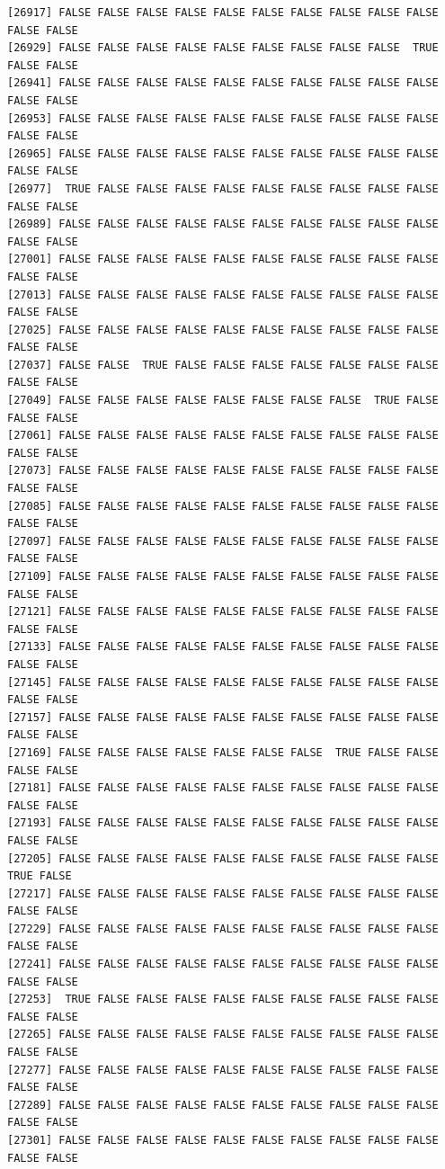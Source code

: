 \documentclass[
  a4paper,
  DIV=11,
  numbers=noendperiod]{scrartcl}
\begin{document}
\begin{verbatim}
[26917] FALSE FALSE FALSE FALSE FALSE FALSE FALSE FALSE FALSE FALSE FALSE FALSE
[26929] FALSE FALSE FALSE FALSE FALSE FALSE FALSE FALSE FALSE  TRUE FALSE FALSE
[26941] FALSE FALSE FALSE FALSE FALSE FALSE FALSE FALSE FALSE FALSE FALSE FALSE
[26953] FALSE FALSE FALSE FALSE FALSE FALSE FALSE FALSE FALSE FALSE FALSE FALSE
[26965] FALSE FALSE FALSE FALSE FALSE FALSE FALSE FALSE FALSE FALSE FALSE FALSE
[26977]  TRUE FALSE FALSE FALSE FALSE FALSE FALSE FALSE FALSE FALSE FALSE FALSE
[26989] FALSE FALSE FALSE FALSE FALSE FALSE FALSE FALSE FALSE FALSE FALSE FALSE
[27001] FALSE FALSE FALSE FALSE FALSE FALSE FALSE FALSE FALSE FALSE FALSE FALSE
[27013] FALSE FALSE FALSE FALSE FALSE FALSE FALSE FALSE FALSE FALSE FALSE FALSE
[27025] FALSE FALSE FALSE FALSE FALSE FALSE FALSE FALSE FALSE FALSE FALSE FALSE
[27037] FALSE FALSE  TRUE FALSE FALSE FALSE FALSE FALSE FALSE FALSE FALSE FALSE
[27049] FALSE FALSE FALSE FALSE FALSE FALSE FALSE FALSE  TRUE FALSE FALSE FALSE
[27061] FALSE FALSE FALSE FALSE FALSE FALSE FALSE FALSE FALSE FALSE FALSE FALSE
[27073] FALSE FALSE FALSE FALSE FALSE FALSE FALSE FALSE FALSE FALSE FALSE FALSE
[27085] FALSE FALSE FALSE FALSE FALSE FALSE FALSE FALSE FALSE FALSE FALSE FALSE
[27097] FALSE FALSE FALSE FALSE FALSE FALSE FALSE FALSE FALSE FALSE FALSE FALSE
[27109] FALSE FALSE FALSE FALSE FALSE FALSE FALSE FALSE FALSE FALSE FALSE FALSE
[27121] FALSE FALSE FALSE FALSE FALSE FALSE FALSE FALSE FALSE FALSE FALSE FALSE
[27133] FALSE FALSE FALSE FALSE FALSE FALSE FALSE FALSE FALSE FALSE FALSE FALSE
[27145] FALSE FALSE FALSE FALSE FALSE FALSE FALSE FALSE FALSE FALSE FALSE FALSE
[27157] FALSE FALSE FALSE FALSE FALSE FALSE FALSE FALSE FALSE FALSE FALSE FALSE
[27169] FALSE FALSE FALSE FALSE FALSE FALSE FALSE  TRUE FALSE FALSE FALSE FALSE
[27181] FALSE FALSE FALSE FALSE FALSE FALSE FALSE FALSE FALSE FALSE FALSE FALSE
[27193] FALSE FALSE FALSE FALSE FALSE FALSE FALSE FALSE FALSE FALSE FALSE FALSE
[27205] FALSE FALSE FALSE FALSE FALSE FALSE FALSE FALSE FALSE FALSE  TRUE FALSE
[27217] FALSE FALSE FALSE FALSE FALSE FALSE FALSE FALSE FALSE FALSE FALSE FALSE
[27229] FALSE FALSE FALSE FALSE FALSE FALSE FALSE FALSE FALSE FALSE FALSE FALSE
[27241] FALSE FALSE FALSE FALSE FALSE FALSE FALSE FALSE FALSE FALSE FALSE FALSE
[27253]  TRUE FALSE FALSE FALSE FALSE FALSE FALSE FALSE FALSE FALSE FALSE FALSE
[27265] FALSE FALSE FALSE FALSE FALSE FALSE FALSE FALSE FALSE FALSE FALSE FALSE
[27277] FALSE FALSE FALSE FALSE FALSE FALSE FALSE FALSE FALSE FALSE FALSE FALSE
[27289] FALSE FALSE FALSE FALSE FALSE FALSE FALSE FALSE FALSE FALSE FALSE FALSE
[27301] FALSE FALSE FALSE FALSE FALSE FALSE FALSE FALSE FALSE FALSE FALSE FALSE

\end{verbatim}
\end{document}

